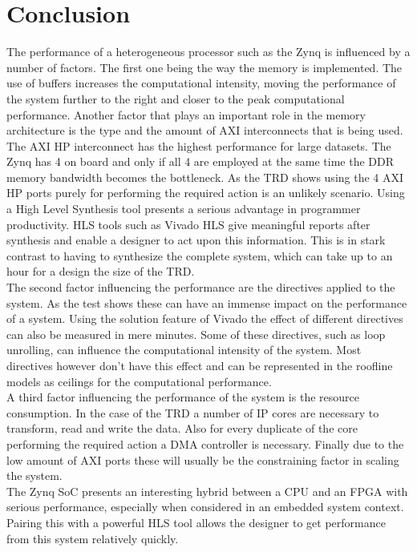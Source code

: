 

\chapter*{Conclusion}

The performance of a heterogeneous processor such as the Zynq is influenced by a number of factors. The first one being the way the memory is implemented. The use of buffers increases the computational intensity, moving the performance of the system further to the right and closer to the peak computational performance. Another factor that plays an important role in the memory architecture is the type and the amount of AXI interconnects that is being used. The AXI HP interconnect has the highest performance for large datasets. The Zynq has 4 on board and only if all 4 are employed at the same time the DDR memory bandwidth becomes the bottleneck. As the TRD shows using the 4 AXI HP ports purely for performing the required action is an unlikely scenario. Using a High Level Synthesis tool presents a serious advantage in programmer productivity. HLS tools such as Vivado HLS give meaningful reports after synthesis and enable a designer to act upon this information. This is in stark contrast to having to synthesize the complete system, which can take up to an hour for a design the size of the TRD.\\
The second factor influencing the performance are the directives applied to the system. As the test shows these can have an immense impact on the performance of a system. Using the solution feature of Vivado the effect of different directives can also be measured in mere minutes. Some of these directives, such as loop unrolling, can influence the computational intensity of the system. Most directives however don't have this effect and can be represented in the roofline models as ceilings for the computational performance.\\
A third factor influencing the performance of the system is the resource consumption. In the case of the TRD a number of IP cores are necessary to transform, read and write the data. Also for every duplicate of the core performing the required action a DMA controller is necessary. Finally due to the low amount of AXI ports these will usually be the constraining factor in scaling the system.\\
The Zynq SoC presents an interesting hybrid between a CPU and an FPGA with serious performance, especially when considered in an embedded system context. Pairing this with a powerful HLS tool allows the designer to get performance from this system relatively quickly.